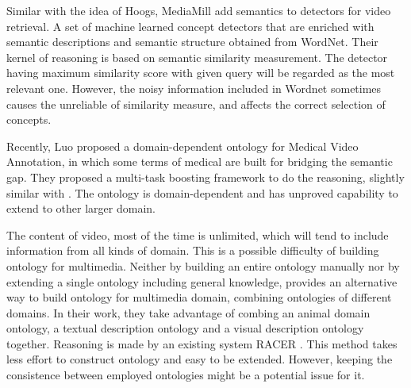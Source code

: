 Similar with the idea of Hoogs, MediaMill
\cite{CeesG.M.Snoek:IEEETM:2006} add semantics to detectors for
video retrieval. A set of machine learned concept detectors that are
enriched with semantic descriptions and semantic structure obtained
from WordNet. Their kernel of reasoning is based on semantic
similarity measurement. The detector having maximum similarity score
with given query will be regarded as the most relevant one. However,
the noisy information included in Wordnet sometimes causes the
unreliable of similarity measure, and affects the correct selection
of concepts.

Recently, Luo \cite{Hangzai.Luo:ACMMM:2006} proposed a
domain-dependent ontology for Medical Video Annotation, in which
some terms of medical are built for bridging the semantic gap. They
proposed a multi-task boosting framework to do the reasoning,
slightly similar with \cite{Yi.Wu:IEEEICOME:2004}. The ontology is
domain-dependent and has unproved capability to extend to other
larger domain.

The content of video, most of the time is unlimited, which will tend
to include information from all kinds of domain. This is a possible
difficulty of building ontology for multimedia. Neither by building
an entire ontology manually nor by extending a single ontology
including general knowledge, \cite{Huan.Wang:ACMM:2006} provides an
alternative way to build ontology for multimedia domain, combining
ontologies of different domains. In their work, they take advantage
of combing an animal domain ontology, a textual description ontology
and a visual description ontology together. Reasoning is made by an
existing system RACER \cite{Volker.Haarslev:ACMSIGIRR:2001}. This
method takes less effort to construct ontology and easy to be
extended. However, keeping the consistence between employed
ontologies might be a potential issue for it.

